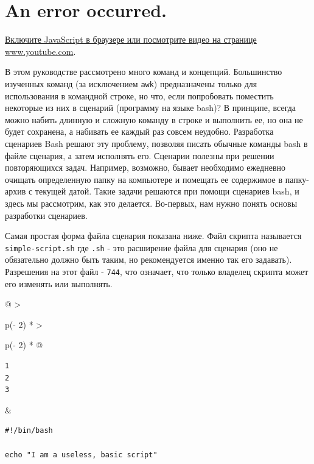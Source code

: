 \documentclass{report}
\begin{document}
\hypertarget{player}{}

\hypertarget{an-error-occurred.}{%
\section{An error occurred.}\label{an-error-occurred.}}

\href{https://www.youtube.com/watch?v=JdvG_H07CNc}{Включите JavaScript в
браузере или посмотрите видео на странице www.youtube.com}.

В этом руководстве рассмотрено много команд и концепций. Большинство
изученных команд (за исключением \texttt{awk}) предназначены только для
использования в командной строке, но что, если попробовать поместить
некоторые из них в сценарий (программу на языке bash)? В принципе,
всегда можно набить длинную и сложную команду в строке и выполнить ее,
но она не будет сохранена, а набивать ее каждый раз совсем неудобно.
Разработка сценариев Bash решают эту проблему, позволяя писать обычные
команды bash в файле сценария, а затем исполнять его. Сценарии полезны
при решении повторяющихся задач. Например, возможно, бывает необходимо
ежедневно очищать определенную папку на компьютере и помещать ее
содержимое в папку-архив с текущей датой. Такие задачи решаются при
помощи сценариев bash, и здесь мы рассмотрим, как это делается.
Во-первых, нам нужно понять основы разработки сценариев.

Самая простая форма файла сценария показана ниже. Файл скрипта
называется \texttt{simple-script.sh} где \texttt{.sh} - это расширение
файла для сценария (оно не обязательно должно быть таким, но
рекомендуется именно так его задавать). Разрешения на этот файл -
\texttt{744}, что означает, что только владелец скрипта может его
изменять или выполнять.

\begin{longtable}[]{@{}
  >{\raggedright\arraybackslash}p{(\columnwidth - 2\tabcolsep) * }
  >{\raggedright\arraybackslash}p{(\columnwidth - 2\tabcolsep) * }@{}}
\toprule
\endhead
\begin{minipage}[t]{\linewidth}\raggedright
\begin{verbatim}
1
2
3
\end{verbatim}
\end{minipage} & \begin{minipage}[t]{\linewidth}\raggedright
\begin{verbatim}
#!/bin/bash

echo "I am a useless, basic script"
\end{verbatim}
\end{minipage} \\ \addlinespace
\bottomrule
\end{longtable}
\end{document}
